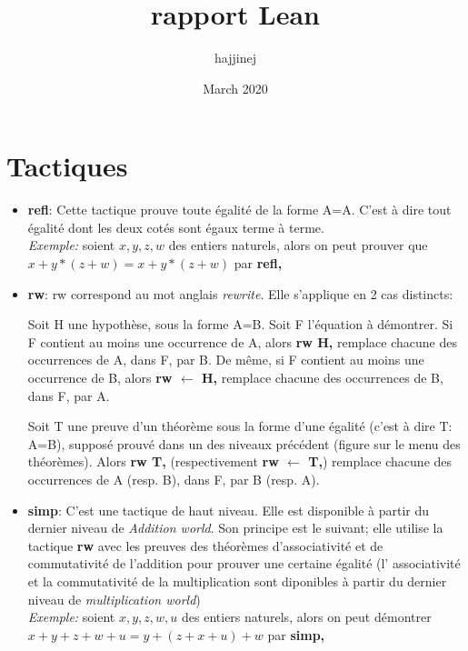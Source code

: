 \documentclass{article}
\title{rapport Lean}
\author{hajjinej }
\date{March 2020}
\begin{document}
\maketitle

\section{Tactiques}
\begin{itemize}
    \item \textbf{refl}: Cette tactique prouve toute égalité de la forme A=A. C'est à dire tout égalité dont les deux cotés sont égaux terme à terme. \\
    \textit{Exemple:} soient $x,y,z,w$ des entiers naturels, alors on peut prouver que $x+y*(z+w)=x+y*(z+w)$ par \textbf{refl,}\\
    \item \textbf{rw}: rw correspond au mot anglais \textit{rewrite}. Elle s'applique en 2 cas distincts:
    
     \hspace{1cm} Soit H une hypothèse, sous la forme A=B.
    Soit F l'équation à démontrer.
    Si F contient au moins une occurrence de A, alors \textbf{rw H,} remplace chacune des occurrences de A, dans F, par B. De même, si F contient au moins une occurrence de B, alors \textbf{rw $\leftarrow$ H,} remplace chacune des occurrences de B, dans F, par A.
    
    \hspace{1cm} Soit T une preuve d'un théorème sous la forme d'une égalité (c'est à dire T: A=B), supposé prouvé dans un des niveaux précédent (figure sur le menu des théorèmes). Alors \textbf{rw T,} (respectivement \textbf{rw $\leftarrow$ T,}) remplace chacune des occurrences de A (resp. B), dans F, par B (resp. A).\\
    \item \textbf{simp}: C'est une tactique de haut niveau. Elle est disponible à partir du dernier niveau de \textit{Addition world}. Son principe est le suivant; elle utilise la tactique \textbf{rw} avec les preuves des théorèmes d'associativité et de commutativité de l'addition pour prouver une certaine égalité (l' associativité et la commutativité de la multiplication sont diponibles à partir du dernier niveau de \textit{multiplication world}) \\
    \textit{Exemple:} soient $x,y,z,w,u$ des entiers naturels, alors on peut démontrer $x+y+z+w+u=y+(z+x+u)+w$ par \textbf{simp,}
    
\end{itemize}
\end{document}
